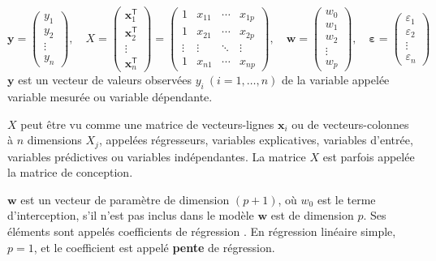 	$
	\mathbf{y} ={\begin{pmatrix}y_{1}\\y_{2}\\\vdots \\y_{n}\end{pmatrix}},\quad
	{\displaystyle 
		X={
			\begin{pmatrix}
			\mathbf {x} _{1}^{\mathsf {T}}\\
			\mathbf {x} _{2}^{\mathsf {T}}\\
			\vdots \\
			\mathbf {x} _{n}^{\mathsf {T}}
			\end{pmatrix}}={
			\begin{pmatrix}
			1&x_{11}&\cdots &x_{1p}\\
			1&x_{21} &\cdots &x_{2p}\\
			\vdots &\vdots &\ddots &\vdots \\
			1&x_{n1}&\cdots &x_{np}
			\end{pmatrix}},} \quad
	{\displaystyle {\boldsymbol {\boldsymbol{w}}}={
			\begin{pmatrix}
			w _{0}\\
			w _{1}\\
			w _{2}\\
			\vdots \\
			w _{p}
			\end{pmatrix}},\quad 
		{\boldsymbol {\varepsilon }}={
			\begin{pmatrix}\varepsilon _{1}\\
			\varepsilon _{2}\\
			\vdots \\
			\varepsilon _{ n}
			\end{pmatrix}}}$ \\
	
	$\mathbf{y}$ est un vecteur de valeurs observées ${\displaystyle y_{i}\ (i=1,\ldots ,n)}$ de la variable appelée variable mesurée ou variable dépendante.
	
	$X$ peut être vu comme une matrice de vecteurs-lignes $\mathbf {x} _{i}$ ou de vecteurs-colonnes à $n$ dimensions $X_{j}$, appelées régresseurs, variables explicatives, variables d'entrée, variables prédictives ou variables indépendantes. La matrice $X$ est parfois appelée la matrice de conception. 
	
	${\boldsymbol {w}}$ est un vecteur de paramètre de dimension $(p+1)$, où $w _{0}$ est le terme d'interception, s'il n'est pas inclus dans le modèle ${\boldsymbol {w}}$ est de dimension $p$. Ses éléments sont appelés coefficients de régression \cite{antoine2018apprentissage}. 
	En régression linéaire simple, $p = 1$, et le coefficient est appelé \textbf{pente} de régression.
	
